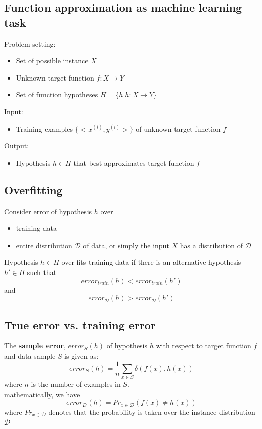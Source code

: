\begin{refsection}
\subsection{Function approximation as machine learning task}
Problem setting:
\begin{itemize}
	\item Set of possible instance $X$
	\item Unknown target function $f:X\rightarrow Y$
	\item Set of function hypotheses $H=\{h|h:X\rightarrow Y\}$
\end{itemize}

Input:
\begin{itemize}
	\item Training examples $\{<x^{(i)},y^{(i)}>\}$ of unknown target function $f$
\end{itemize}

Output:
\begin{itemize}
	\item Hypothesis $h\in H$ that best approximates target function $f$
\end{itemize}



\subsection{Overfitting}
Consider error of hypothesis $h$ over
\begin{itemize}
    \item training data
    \item entire distribution $\mathcal{D}$ of data, or simply the input $X$ has a distribution of $\mathcal{D}$
\end{itemize}
Hypothesis $h\in H$ over-fits training data if there is an alternative hypothesis $h'\in H$ such that
$$error_{train}(h) < error_{train}(h')$$
and
$$error_{\mathcal{D}}(h) > error_{\mathcal{D}}(h')$$




\subsection{True error vs. training error}
The \textbf{sample error}, $error_S(h)$ of hypothesis $h$ with respect to target function $f$ and data sample $S$ is given as:
$$error_S(h)=\frac{1}{n}\sum_{x\in S}\delta(f(x),h(x))$$
where $n$ is the number of examples in $S$.\\
 mathematically, we have
$$error_D(h) = Pr_{x \in \mathcal{D}}(f(x)\neq h(x))$$
where $Pr_{x \in \mathcal{D}}$ denotes that the probability is taken over the instance distribution $\mathcal{D}$




\end{refsection}
